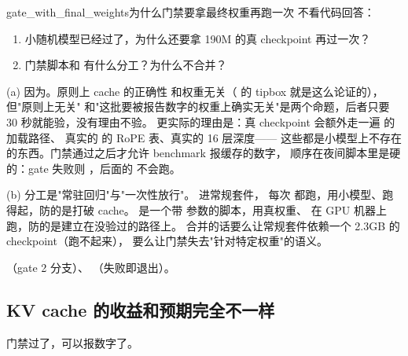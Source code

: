 \begin{checkpoint}{gate_with_final_weights}{为什么门禁要拿最终权重再跑一次}
不看代码回答：
\begin{enumerate}[label=(\alph*)]
  \item 小随机模型已经过了，为什么还要拿 190M 的真 checkpoint 再过一次？
  \item 门禁脚本和  有什么分工？为什么不合并？
\end{enumerate}

\ifshowanswers
\tcblower
\answer (a) 因为。原则上 cache 的正确性
和权重无关（ 的 tipbox 就是这么论证的），但"原则上无关"
和"这批要被报告数字的权重上确实无关"是两个命题，后者只要 30 秒就能验，没有理由不验。
更实际的理由是：真 checkpoint 会额外走一遍  的加载路径、
真实的  的 RoPE 表、真实的 16 层深度——
这些都是小模型上不存在的东西。门禁通过之后才允许 benchmark 报缓存的数字，
顺序在夜间脚本里是硬的：gate 失败则 ，后面的  不会跑。

(b) 分工是"常驻回归"与"一次性放行"。 进常规套件，
每次  都跑，用小模型、跑得起，防的是打破 cache。
 是一个带  参数的脚本，用真权重、
在 GPU 机器上跑，防的是建立在没验过的路径上。
合并的话要么让常规套件依赖一个 2.3GB 的 checkpoint（跑不起来），
要么让门禁失去"针对特定权重"的语义。

\whereincode {}（gate 2 分支）、
（失败即退出）。
\fi
\end{checkpoint}

\subsection{KV cache 的收益和预期完全不一样}
\label{sec:b-kv-flat}

门禁过了，可以报数字了。

